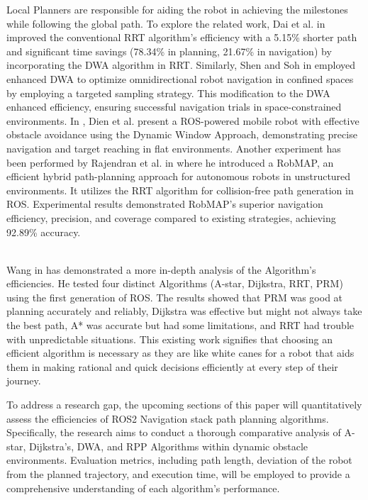 \documentclass[sigconf]{acmart}
\begin{document}
Local Planners are responsible for aiding the robot in achieving the milestones while following the global path. To explore the related work, Dai et al. in \cite{b7} improved the conventional RRT algorithm's efficiency with a 5.15\% shorter path and significant time savings (78.34\% in planning, 21.67\% in navigation) by incorporating the DWA algorithm in RRT. Similarly, Shen and Soh in \cite{b8} employed enhanced DWA to optimize omnidirectional robot navigation in confined spaces by employing a targeted sampling strategy. This modification to the DWA enhanced efficiency, ensuring successful navigation trials in space-constrained environments. In \cite{b9}, Dien et al. present a ROS-powered mobile robot with effective obstacle avoidance using the Dynamic Window Approach, demonstrating precise navigation and target reaching in flat environments. Another experiment has been performed by Rajendran et al. in \cite{b10} where he introduced a RobMAP, an efficient hybrid path-planning approach for autonomous robots in unstructured environments. It utilizes the RRT algorithm for collision-free path generation in ROS. Experimental results demonstrated RobMAP's superior navigation efficiency, precision, and coverage compared to existing strategies, achieving 92.89\% accuracy. 

\\
Wang in \cite{b11} has demonstrated a more in-depth analysis of the Algorithm's efficiencies. He tested four distinct Algorithms (A-star, Dijkstra, RRT, PRM) using the first generation of ROS. The results showed that PRM was good at planning accurately and reliably, Dijkstra was effective but might not always take the best path, A* was accurate but had some limitations, and RRT had trouble with unpredictable situations. This existing work signifies that choosing an efficient algorithm is necessary as they are like white canes for a robot that aids them in making rational and quick decisions efficiently at every step of their journey. 

To address a research gap, the upcoming sections of this paper will quantitatively assess the efficiencies of ROS2 Navigation stack path planning algorithms. Specifically, the research aims to conduct a thorough comparative analysis of A-star, Dijkstra’s, DWA, and RPP Algorithms within dynamic obstacle environments. Evaluation metrics, including path length, deviation of the robot from the planned trajectory, and execution time, will be employed to provide a comprehensive understanding of each algorithm's performance.
\end{document}
